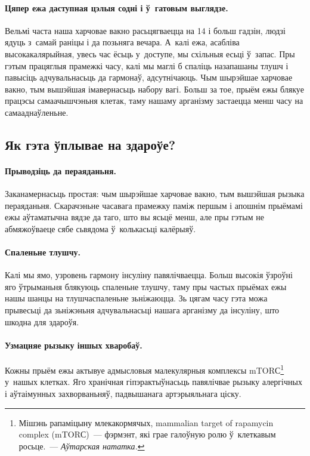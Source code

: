 \paragraph{Цяпер ежа даступная цэлыя содні і ў~гатовым выглядзе.}

Вельмі часта наша харчовае вакно расьцягваецца на 14 і больш гадзін, людзі ядуць з~самай раніцы і да позьняга вечара. А~калі ежа, асабліва высокакалярыйная, увесь час ёсьць у~доступе, мы схільныя есьці ў~запас. Пры гэтым працяглыя прамежкі часу, калі мы маглі б спаліць назапашаны тлушч і павысіць адчувальнасьць да гармонаў, адсутнічаюць. Чым шырэйшае харчовае вакно, тым вышэйшая імавернасьць набору вагі. Больш за тое, прыём ежы блякуе працэсы самаачышчэньня клетак, таму нашаму арганізму застаецца менш часу на самааднаўленьне.

\subsection{Як гэта ўплывае на здароўе?}

\paragraph{Прыводзіць да пераяданьня.}
Заканамернасьць простая: чым шырэйшае харчовае вакно, тым вышэйшая рызыка пераяданьня. Скарачэньне часавага прамежку паміж першым і апошнім прыёмамі ежы аўтаматычна вядзе да таго, што вы ясьцё менш, але пры гэтым не абмяжоўваеце сябе сьвядома ў~колькасьці калёрыяў.

\paragraph{Спаленьне тлушчу.}
Калі мы ямо, узровень гармону інсуліну павялічваецца. Больш высокія ўзроўні яго ўтрыманьня блякуюць спаленьне тлушчу, таму пры частых прыёмах ежы нашы шанцы на тлушчаспаленьне зьніжаюцца. Зь цягам часу гэта можа прывесьці да зьніжэньня адчувальнасьці нашага арганізму да інсуліну, што шкодна для здароўя.

\paragraph{Узмацняе рызыку іншых хваробаў.}
Кожны прыём ежы актывуе адмысловыя малекулярныя комплексы mTORС\footnote{Мішэнь рапаміцыну млекакормячых, mammalian target of rapamycin
complex (mTORС)~--- фэрмэнт, які грае галоўную ролю ў~клеткавым 
росьце.~--- \emph{Аўтарская нататка.}} у~нашых клетках. Яго хранічная гіпэрактыўнасьць павялічвае рызыку алергічных і аўтаімунных захворваньняў, падвышанага артэрыяльнага ціску.

